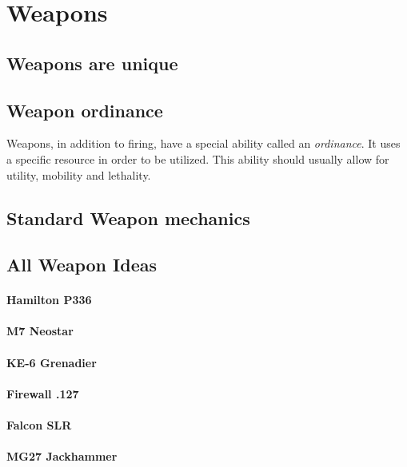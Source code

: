 \documentclass[../Main.tex]{subfiles}
\begin{document}
\section{Weapons}


\subsection{Weapons are unique}


\subsection{Weapon ordinance}

Weapons, in addition to firing, have a special ability called an \emph{ordinance}. It uses a specific resource in order to be utilized. This ability should usually allow for utility, mobility and lethality.

\subsection{Standard Weapon mechanics}


\subsection{All Weapon Ideas}

\paragraph{Hamilton P336}

\paragraph{M7 Neostar}


\paragraph{KE-6 Grenadier}
 

\paragraph{Firewall .127}


\paragraph{Falcon SLR}


\paragraph{MG27 Jackhammer}
\end{document}
